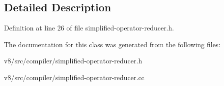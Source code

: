 \subsection{Detailed Description}


Definition at line 26 of file simplified-\/operator-\/reducer.\+h.



The documentation for this class was generated from the following files\+:\begin{DoxyCompactItemize}
\item 
v8/src/compiler/simplified-\/operator-\/reducer.\+h\item 
v8/src/compiler/simplified-\/operator-\/reducer.\+cc\end{DoxyCompactItemize}
